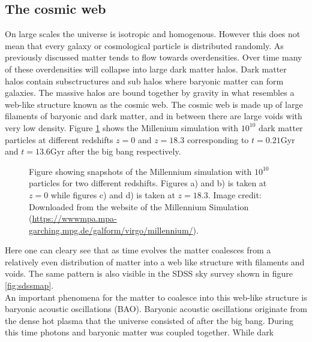 \subsection{The cosmic web}
On large scales the universe is isotropic and homogenous. However this does not
mean that every galaxy or cosmological particle is distributed randomly. As
previously discussed matter tends to flow towards overdensities. Over time many
of these overdensities will collapse into large dark matter halos. Dark matter
halos contain subsctructures and sub halos where baryonic matter can form
galaxies. The massive halos are bound together by gravity in what resembles a
web-like structure known as the cosmic web. The cosmic web is made up of large
filaments of baryonic and dark matter, and in between there are large voids with
very low density. Figure \ref{fig:millenium} shows the Millenium simulation with
$10^{10}$ dark matter particles at different redshifts $z=0$ and $z=18.3$ corresponding to
$t=0.21$Gyr and $t=13.6$Gyr after the big bang respectively.
\begin{figure}[htbp]\label{fig:millenium}
    \hspace{1em}%
    \hspace{1em}%
    \caption{Figure showing snapshots of the Millennium simulation with $10^{10}$ particles
    for two different redshifts. Figures a) and b) is taken at $z=0$ while
    figures c) and d) is taken at $z=18.3$. Image credit: Downloaded from the
    website of the Millennium Simulation\cite{Millennium} (\url{https://wwwmpa.mpa-garching.mpg.de/galform/virgo/millennium/}).}
\end{figure}
Here one can cleary see that as time evolves the matter coalesces from a
relatively even distribution of matter into a web like structure with filaments
and voids. The same pattern is also visible in the SDSS sky survey shown in
figure \ref{fig:sdssmap}.\\\indent
An important phenomena for the matter to coalesce into this web-like structure is
baryonic acoustic oscillations (BAO). Baryonic acoustic oscillations originate
from the dense hot plasma that the universe consisted of after the big bang.
During this time photons and baryonic matter was coupled together. While dark
